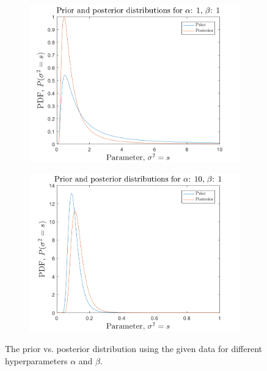 \documentclass{article}
\begin{document}
\begin{figure}[H]
    \centering
    \begin{subfigure}[b]{0.65\textwidth}
        \centering
        \includegraphics[width=\textwidth]{Figures/plot2_2_a1.png}
    \end{subfigure}
    \begin{subfigure}[b]{0.65\textwidth}
        \centering
        \includegraphics[width=\textwidth]{Figures/plot2_2_a2.png}
    \end{subfigure}
    \caption{\label{fig:distributions} The prior vs. posterior distribution using the given data for different hyperparameters $\alpha$ and $\beta$.}
\end{figure}
\end{document}
